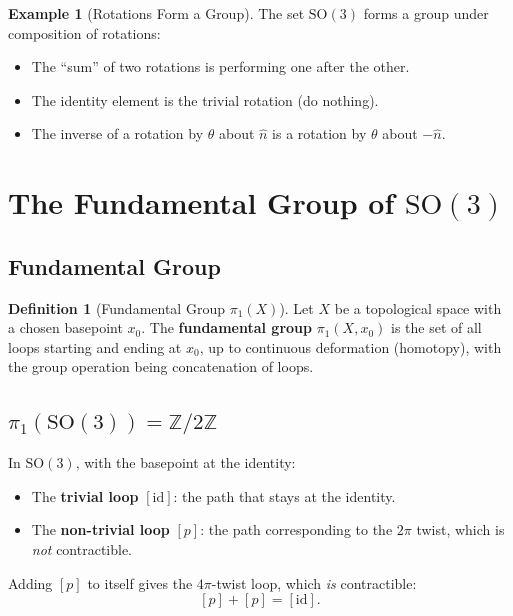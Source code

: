 \documentclass[11pt,a4paper]{article}
\theoremstyle{definition}
\newtheorem{definition}{Definition}[section]
\newtheorem{example}{Example}[section]
\theoremstyle{plain}
\theoremstyle{remark}
\begin{document}
\begin{example}[Rotations Form a Group]
    The set $\mathrm{SO}(3)$ forms a group under composition of rotations:
    \begin{itemize}
        \item The ``sum'' of two rotations is performing one after the other.
        \item The identity element is the trivial rotation (do nothing).
        \item The inverse of a rotation by $\theta$ about $\hat{n}$ is a rotation by $\theta$ about $-\hat{n}$.
    \end{itemize}
\end{example}

\section{The Fundamental Group of $\mathrm{SO}(3)$}

\subsection{Fundamental Group}

\begin{definition}[Fundamental Group $\pi_1(X)$]
    Let $X$ be a topological space with a chosen basepoint $x_0$. The \textbf{fundamental group} $\pi_1(X, x_0)$ is the set of all loops starting and ending at $x_0$, up to continuous deformation (homotopy), with the group operation being concatenation of loops.
\end{definition}

\subsection{$\pi_1(\mathrm{SO}(3)) = \mathbb{Z}/2\mathbb{Z}$}

In $\mathrm{SO}(3)$, with the basepoint at the identity:
\begin{itemize}
    \item The \textbf{trivial loop} $[\mathrm{id}]$: the path that stays at the identity.
    \item The \textbf{non-trivial loop} $[p]$: the path corresponding to the $2\pi$ twist, which is \emph{not} contractible.
\end{itemize}

Adding $[p]$ to itself gives the $4\pi$-twist loop, which \emph{is} contractible:
\[
    [p] + [p] = [\mathrm{id}].
\]
\end{document}
